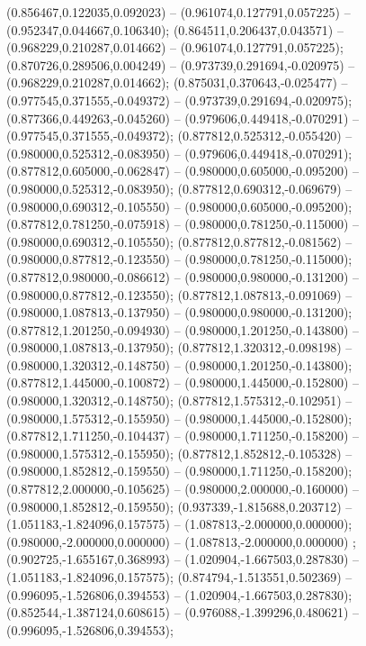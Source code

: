  (0.856467,0.122035,0.092023) -- (0.961074,0.127791,0.057225) -- (0.952347,0.044667,0.106340);
 (0.864511,0.206437,0.043571) -- (0.968229,0.210287,0.014662) -- (0.961074,0.127791,0.057225);
 (0.870726,0.289506,0.004249) -- (0.973739,0.291694,-0.020975) -- (0.968229,0.210287,0.014662);
 (0.875031,0.370643,-0.025477) -- (0.977545,0.371555,-0.049372) -- (0.973739,0.291694,-0.020975);
 (0.877366,0.449263,-0.045260) -- (0.979606,0.449418,-0.070291) -- (0.977545,0.371555,-0.049372);
 (0.877812,0.525312,-0.055420) -- (0.980000,0.525312,-0.083950) -- (0.979606,0.449418,-0.070291);
 (0.877812,0.605000,-0.062847) -- (0.980000,0.605000,-0.095200) -- (0.980000,0.525312,-0.083950);
 (0.877812,0.690312,-0.069679) -- (0.980000,0.690312,-0.105550) -- (0.980000,0.605000,-0.095200);
 (0.877812,0.781250,-0.075918) -- (0.980000,0.781250,-0.115000) -- (0.980000,0.690312,-0.105550);
 (0.877812,0.877812,-0.081562) -- (0.980000,0.877812,-0.123550) -- (0.980000,0.781250,-0.115000);
 (0.877812,0.980000,-0.086612) -- (0.980000,0.980000,-0.131200) -- (0.980000,0.877812,-0.123550);
 (0.877812,1.087813,-0.091069) -- (0.980000,1.087813,-0.137950) -- (0.980000,0.980000,-0.131200);
 (0.877812,1.201250,-0.094930) -- (0.980000,1.201250,-0.143800) -- (0.980000,1.087813,-0.137950);
 (0.877812,1.320312,-0.098198) -- (0.980000,1.320312,-0.148750) -- (0.980000,1.201250,-0.143800);
 (0.877812,1.445000,-0.100872) -- (0.980000,1.445000,-0.152800) -- (0.980000,1.320312,-0.148750);
 (0.877812,1.575312,-0.102951) -- (0.980000,1.575312,-0.155950) -- (0.980000,1.445000,-0.152800);
 (0.877812,1.711250,-0.104437) -- (0.980000,1.711250,-0.158200) -- (0.980000,1.575312,-0.155950);
 (0.877812,1.852812,-0.105328) -- (0.980000,1.852812,-0.159550) -- (0.980000,1.711250,-0.158200);
 (0.877812,2.000000,-0.105625) -- (0.980000,2.000000,-0.160000) -- (0.980000,1.852812,-0.159550);
 (0.937339,-1.815688,0.203712) -- (1.051183,-1.824096,0.157575) -- (1.087813,-2.000000,0.000000);
 (0.980000,-2.000000,0.000000) -- (1.087813,-2.000000,0.000000) ;
 (0.902725,-1.655167,0.368993) -- (1.020904,-1.667503,0.287830) -- (1.051183,-1.824096,0.157575);
 (0.874794,-1.513551,0.502369) -- (0.996095,-1.526806,0.394553) -- (1.020904,-1.667503,0.287830);
 (0.852544,-1.387124,0.608615) -- (0.976088,-1.399296,0.480621) -- (0.996095,-1.526806,0.394553);
